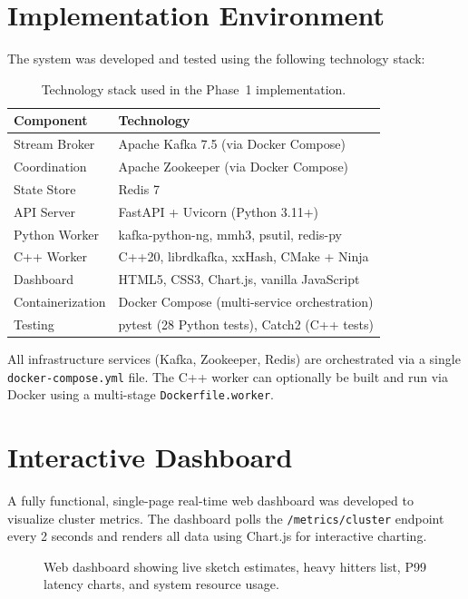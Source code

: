 \section{Implementation Environment}

The system was developed and tested using the following technology stack:

\begin{table}[htbp]
\centering
\begin{tabular}{l l}
\toprule
\textbf{Component} & \textbf{Technology} \\
\midrule
Stream Broker       & Apache Kafka 7.5 (via Docker Compose) \\
Coordination        & Apache Zookeeper (via Docker Compose) \\
State Store         & Redis 7 \\
API Server          & FastAPI + Uvicorn (Python 3.11+) \\
Python Worker       & kafka-python-ng, mmh3, psutil, redis-py \\
C++ Worker          & C++20, librdkafka, xxHash, CMake + Ninja \\
Dashboard           & HTML5, CSS3, Chart.js, vanilla JavaScript \\
Containerization    & Docker Compose (multi-service orchestration) \\
Testing             & pytest (28 Python tests), Catch2 (C++ tests) \\
\bottomrule
\end{tabular}
\caption{Technology stack used in the Phase~1 implementation.}
\label{tab:tech_stack}
\end{table}

All infrastructure services (Kafka, Zookeeper, Redis) are orchestrated via a single \texttt{docker-compose.yml} file. The C++ worker can optionally be built and run via Docker using a multi-stage \texttt{Dockerfile.worker}.

\section{Interactive Dashboard}

A fully functional, single-page real-time web dashboard was developed to visualize cluster metrics. The dashboard polls the \texttt{/metrics/cluster} endpoint every 2 seconds and renders all data using Chart.js for interactive charting.

\begin{figure}[htbp]
    \centering
    \caption{Web dashboard showing live sketch estimates, heavy hitters list, P99 latency charts, and system resource usage.}
    \label{fig:dashboard_screenshot}
\end{figure}

